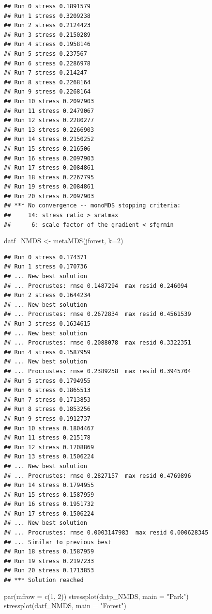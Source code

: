 \documentclass[
]{article}
\newenvironment{Shaded}{\begin{snugshade}}{\end{snugshade}}
\newcommand{\AttributeTok}[1]{\textcolor[rgb]{0.77,0.63,0.00}{#1}}
\newcommand{\DecValTok}[1]{\textcolor[rgb]{0.00,0.00,0.81}{#1}}
\newcommand{\FunctionTok}[1]{\textcolor[rgb]{0.00,0.00,0.00}{#1}}
\newcommand{\NormalTok}[1]{#1}
\newcommand{\OtherTok}[1]{\textcolor[rgb]{0.56,0.35,0.01}{#1}}
\newcommand{\StringTok}[1]{\textcolor[rgb]{0.31,0.60,0.02}{#1}}
\begin{document}
\begin{verbatim}
## Run 0 stress 0.1891579 
## Run 1 stress 0.3209238 
## Run 2 stress 0.2124423 
## Run 3 stress 0.2150289 
## Run 4 stress 0.1958146 
## Run 5 stress 0.237567 
## Run 6 stress 0.2286978 
## Run 7 stress 0.214247 
## Run 8 stress 0.2268164 
## Run 9 stress 0.2268164 
## Run 10 stress 0.2097903 
## Run 11 stress 0.2479067 
## Run 12 stress 0.2280277 
## Run 13 stress 0.2266903 
## Run 14 stress 0.2150252 
## Run 15 stress 0.216506 
## Run 16 stress 0.2097903 
## Run 17 stress 0.2084861 
## Run 18 stress 0.2267795 
## Run 19 stress 0.2084861 
## Run 20 stress 0.2097903 
## *** No convergence -- monoMDS stopping criteria:
##     14: stress ratio > sratmax
##      6: scale factor of the gradient < sfgrmin
\end{verbatim}

\begin{Shaded}
\begin{Highlighting}[]
\NormalTok{datf\_NMDS }\OtherTok{\textless{}{-}} \FunctionTok{metaMDS}\NormalTok{(jforest, }\AttributeTok{k=}\DecValTok{2}\NormalTok{)}
\end{Highlighting}
\end{Shaded}

\begin{verbatim}
## Run 0 stress 0.174371 
## Run 1 stress 0.170736 
## ... New best solution
## ... Procrustes: rmse 0.1487294  max resid 0.246094 
## Run 2 stress 0.1644234 
## ... New best solution
## ... Procrustes: rmse 0.2672834  max resid 0.4561539 
## Run 3 stress 0.1634615 
## ... New best solution
## ... Procrustes: rmse 0.2088078  max resid 0.3322351 
## Run 4 stress 0.1587959 
## ... New best solution
## ... Procrustes: rmse 0.2389258  max resid 0.3945704 
## Run 5 stress 0.1794955 
## Run 6 stress 0.1865513 
## Run 7 stress 0.1713853 
## Run 8 stress 0.1853256 
## Run 9 stress 0.1912737 
## Run 10 stress 0.1804467 
## Run 11 stress 0.215178 
## Run 12 stress 0.1708869 
## Run 13 stress 0.1506224 
## ... New best solution
## ... Procrustes: rmse 0.2827157  max resid 0.4769896 
## Run 14 stress 0.1794955 
## Run 15 stress 0.1587959 
## Run 16 stress 0.1951732 
## Run 17 stress 0.1506224 
## ... New best solution
## ... Procrustes: rmse 0.0003147983  max resid 0.000628345 
## ... Similar to previous best
## Run 18 stress 0.1587959 
## Run 19 stress 0.2197233 
## Run 20 stress 0.1713853 
## *** Solution reached
\end{verbatim}

\begin{Shaded}
\begin{Highlighting}[]
\FunctionTok{par}\NormalTok{(}\AttributeTok{mfrow =} \FunctionTok{c}\NormalTok{(}\DecValTok{1}\NormalTok{, }\DecValTok{2}\NormalTok{))}
\FunctionTok{stressplot}\NormalTok{(datp\_NMDS, }\AttributeTok{main =} \StringTok{"Park"}\NormalTok{)}
\FunctionTok{stressplot}\NormalTok{(datf\_NMDS, }\AttributeTok{main =} \StringTok{"Forest"}\NormalTok{)}
\end{Highlighting}
\end{Shaded}
\end{document}
